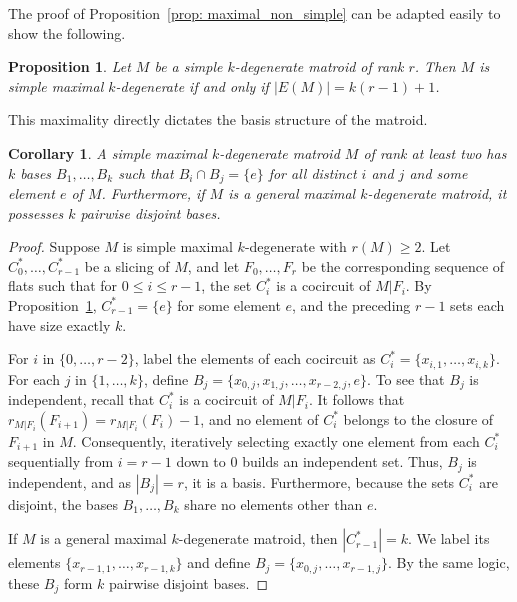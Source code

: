 \documentclass{amsart}
\newtheorem{corollary}[theorem]{Corollary}
\newtheorem{proposition}[theorem]{Proposition}
\theoremstyle{definition}
\theoremstyle{remark}
\numberwithin{equation}{section}
\begin{document}
The proof of Proposition~\ref{prop: maximal_non_simple} can be adapted easily to show the following. 

\begin{proposition}
\label{prop: maximal_simple}
Let $M$ be a simple $k$-degenerate matroid of rank $r$. Then $M$ is simple maximal $k$-degenerate if and only if $|E(M)| = k(r-1) + 1$. 
\end{proposition}

This maximality directly dictates the basis structure of the matroid.

\begin{corollary}
A simple maximal $k$-degenerate matroid $M$ of rank at least two has $k$ bases $B_1, \ldots, B_k$ such that $B_i \cap B_j = \{e\}$ for all distinct $i$ and $j$ and some element $e$ of $M$. Furthermore, if $M$ is a general maximal $k$-degenerate matroid, it possesses $k$ pairwise disjoint bases. 
\end{corollary}

\begin{proof}
Suppose $M$ is simple maximal $k$-degenerate with $r(M)\geq 2$. Let $C^*_0, \ldots, C^*_{r-1}$ be a slicing of $M$, and let $F_0, \ldots, F_r$ be the corresponding sequence of flats such that for $0 \leq i \leq r-1$, the set $C^*_i$ is a cocircuit of $M|F_i$. By Proposition~\ref{prop: maximal_simple}, $C^*_{r-1} = \{e\}$ for some element $e$, and the preceding $r-1$ sets each have size exactly $k$.

For $i$ in $\{0, \ldots, r-2\}$, label the elements of each cocircuit as $C^*_i = \{x_{i,1}, \ldots, x_{i,k}\}$. For each $j$ in $\{1, \ldots, k\}$, define $B_j = \{x_{0,j}, x_{1,j}, \ldots, x_{r-2,j}, e\}$. To see that $B_j$ is independent, recall that $C^*_i$ is a cocircuit of $M|F_i$. It follows that $r_{M|F_i}(F_{i+1}) = r_{M|F_i}(F_i) - 1$, and no element of $C^*_i$ belongs to the closure of $F_{i+1}$ in $M$. Consequently, iteratively selecting exactly one element from each $C^*_i$ sequentially from $i = r-1$ down to $0$ builds an independent set. Thus, $B_j$ is independent, and as $|B_j| = r$, it is a basis. Furthermore, because the sets $C^*_i$ are disjoint, the bases $B_1, \ldots, B_k$ share no elements other than $e$.

If $M$ is a general maximal $k$-degenerate matroid, then $|C^*_{r-1}| = k$. We label its elements $\{x_{r-1, 1}, \ldots, x_{r-1, k}\}$ and define $B_j = \{x_{0,j}, \ldots, x_{r-1, j}\}$. By the same logic, these $B_j$ form $k$ pairwise disjoint bases. 
\end{proof}
\end{document}
